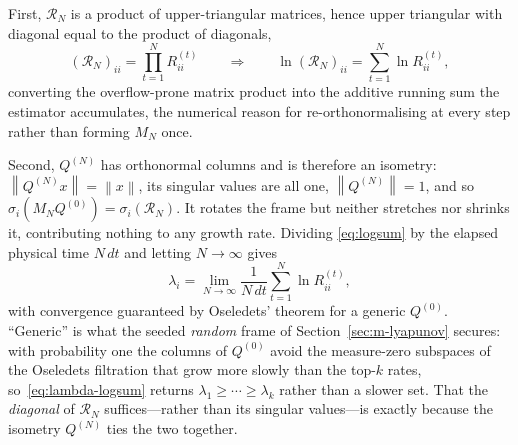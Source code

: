 \documentclass[11pt]{article}
\newcommand{\norm}[1]{\left\lVert #1 \right\rVert}
\begin{document}
First, $\mathcal{R}_N$ is a product of upper-triangular matrices, hence upper triangular
with diagonal equal to the product of diagonals,
\begin{equation}
(\mathcal{R}_N)_{ii}=\prod_{t=1}^{N} R^{(t)}_{ii}
\qquad\Longrightarrow\qquad
\ln(\mathcal{R}_N)_{ii}=\sum_{t=1}^{N}\ln R^{(t)}_{ii},
\label{eq:logsum}
\end{equation}
converting the overflow-prone matrix product into the additive running sum the estimator
accumulates, the numerical reason for re-orthonormalising at every step rather
than forming $M_N$ once.

Second, $Q^{(N)}$ has orthonormal columns and is therefore an isometry:
$\norm{Q^{(N)}x}=\norm{x}$, its singular values are all one, $\norm{Q^{(N)}}=1$, and so
$\sigma_i(M_N Q^{(0)})=\sigma_i(\mathcal{R}_N)$. It rotates the frame but neither
stretches nor shrinks it, contributing nothing to any growth rate. Dividing
\eqref{eq:logsum} by the elapsed physical time $N\,dt$ and letting $N\to\infty$ gives
\begin{equation}
\lambda_i=\lim_{N\to\infty}\frac{1}{N\,dt}\sum_{t=1}^{N}\ln R^{(t)}_{ii},
\label{eq:lambda-logsum}
\end{equation}
with convergence guaranteed by Oseledets' theorem for a generic $Q^{(0)}$. ``Generic'' is
what the seeded \emph{random} frame of Section~\ref{sec:m-lyapunov} secures: with
probability one the columns of $Q^{(0)}$ avoid the measure-zero subspaces of the Oseledets
filtration that grow more slowly than the top-$k$ rates, so~\eqref{eq:lambda-logsum}
returns $\lambda_1\ge\cdots\ge\lambda_k$ rather than a slower set. That the \emph{diagonal}
of $\mathcal{R}_N$ suffices---rather than its singular values---is exactly because the
isometry $Q^{(N)}$ ties the two together.

\nocite{*}  %
\printbibliography
\end{document}
